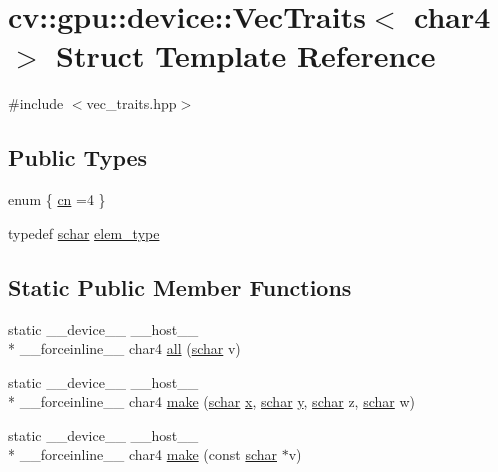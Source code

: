 \hypertarget{structcv_1_1gpu_1_1device_1_1VecTraits_3_01char4_01_4}{\section{cv\-:\-:gpu\-:\-:device\-:\-:Vec\-Traits$<$ char4 $>$ Struct Template Reference}
\label{structcv_1_1gpu_1_1device_1_1VecTraits_3_01char4_01_4}
}


{\ttfamily \#include $<$vec\-\_\-traits.\-hpp$>$}

\subsection*{Public Types}
\begin{DoxyCompactItemize}
\item 
enum \{ \hyperlink{structcv_1_1gpu_1_1device_1_1VecTraits_3_01char4_01_4_a4d6a69e7087ca3431640b67bb3fe6bd0aecec29501c6201526a7f637d07cfd3fc}{cn} =4
 \}
\item 
typedef \hyperlink{core_2types__c_8h_a0fd9ce9d735064461bebfe6037026093}{schar} \hyperlink{structcv_1_1gpu_1_1device_1_1VecTraits_3_01char4_01_4_ab227d0d90450e8240033110ea370be32}{elem\-\_\-type}
\end{DoxyCompactItemize}
\subsection*{Static Public Member Functions}
\begin{DoxyCompactItemize}
\item 
static \-\_\-\-\_\-device\-\_\-\-\_\- \-\_\-\-\_\-host\-\_\-\-\_\- \\*
\-\_\-\-\_\-forceinline\-\_\-\-\_\- char4 \hyperlink{structcv_1_1gpu_1_1device_1_1VecTraits_3_01char4_01_4_a5e87e2e72736e19e14c982d5f6fef5fb}{all} (\hyperlink{core_2types__c_8h_a0fd9ce9d735064461bebfe6037026093}{schar} v)
\item 
static \-\_\-\-\_\-device\-\_\-\-\_\- \-\_\-\-\_\-host\-\_\-\-\_\- \\*
\-\_\-\-\_\-forceinline\-\_\-\-\_\- char4 \hyperlink{structcv_1_1gpu_1_1device_1_1VecTraits_3_01char4_01_4_ab3d989236c91edc44cf6c62e9d00cc5e}{make} (\hyperlink{core_2types__c_8h_a0fd9ce9d735064461bebfe6037026093}{schar} \hyperlink{highgui__c_8h_a6150e0515f7202e2fb518f7206ed97dc}{x}, \hyperlink{core_2types__c_8h_a0fd9ce9d735064461bebfe6037026093}{schar} \hyperlink{highgui__c_8h_af1202c02b14870c18fb3a1da73e9e7c7}{y}, \hyperlink{core_2types__c_8h_a0fd9ce9d735064461bebfe6037026093}{schar} z, \hyperlink{core_2types__c_8h_a0fd9ce9d735064461bebfe6037026093}{schar} w)
\item 
static \-\_\-\-\_\-device\-\_\-\-\_\- \-\_\-\-\_\-host\-\_\-\-\_\- \\*
\-\_\-\-\_\-forceinline\-\_\-\-\_\- char4 \hyperlink{structcv_1_1gpu_1_1device_1_1VecTraits_3_01char4_01_4_a025259664b878879e99ffe0c0aafafb3}{make} (const \hyperlink{core_2types__c_8h_a0fd9ce9d735064461bebfe6037026093}{schar} $\ast$v)
\end{DoxyCompactItemize}


